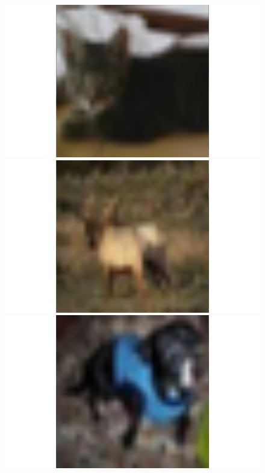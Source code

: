 \begin{figure}
\begin{minipage}{0.19\textwidth}
 \end{minipage}
 \begin{minipage}{0.19\textwidth}
  \includegraphics[width=1.5\textwidth]{../plots/cifar10-class3}
 \end{minipage}
 \begin{minipage}{0.19\textwidth}
  \includegraphics[width=1.5\textwidth]{../plots/cifar10-class4}
 \end{minipage}
 \begin{minipage}{0.19\textwidth}
  \includegraphics[width=1.5\textwidth]{../plots/cifar10-class5}

\end{minipage}
\end{figure}
